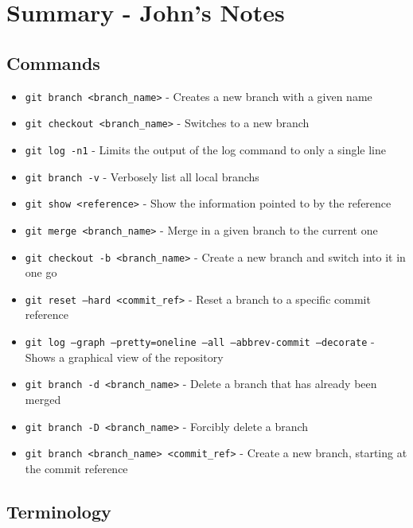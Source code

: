 \clearpage

\section{Summary - John's Notes}
\subsection{Commands}
\begin{itemize}
\item\texttt{git branch <branch\_name>} - Creates a new branch with a given name

\item\texttt{git checkout <branch\_name>} - Switches to a new branch

\item\texttt{git log -n1} - Limits the output of the log command to only a single line

\item\texttt{git branch -v} - Verbosely list all local branchs

\item\texttt{git show <reference>} - Show the information pointed to by the reference

\item\texttt{git merge <branch\_name>} - Merge in a given branch to the current one

\item\texttt{git checkout -b <branch\_name>} - Create a new branch and switch into it in one go

\item\texttt{git reset --hard <commit\_ref>} - Reset a branch to a specific commit reference

\item\texttt{git log --graph --pretty=oneline --all --abbrev-commit --decorate} - Shows a graphical view of the repository

\item\texttt{git branch -d <branch\_name>} - Delete a branch that has already been merged

\item\texttt{git branch -D <branch\_name>} - Forcibly delete a branch

\item\texttt{git branch <branch\_name> <commit\_ref>} - Create a new branch, starting at the commit reference

\end{itemize}

\subsection{Terminology}

